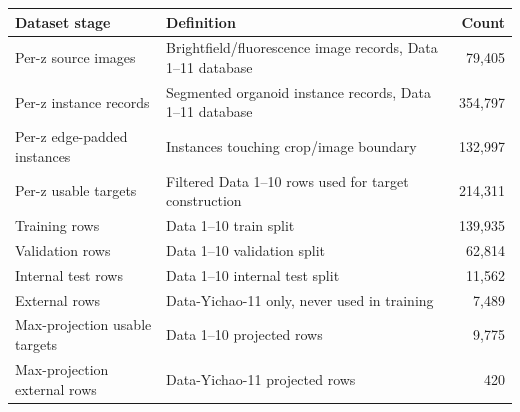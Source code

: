 \begin{tabular}{@{}llr@{}}
\toprule
Dataset stage & Definition & Count \\
\midrule
Per-z source images & Brightfield/fluorescence image records, Data 1--11 database & 79,405 \\
Per-z instance records & Segmented organoid instance records, Data 1--11 database & 354,797 \\
Per-z edge-padded instances & Instances touching crop/image boundary & 132,997 \\
Per-z usable targets & Filtered Data 1--10 rows used for target construction & 214,311 \\
Training rows & Data 1--10 train split & 139,935 \\
Validation rows & Data 1--10 validation split & 62,814 \\
Internal test rows & Data 1--10 internal test split & 11,562 \\
External rows & Data-Yichao-11 only, never used in training & 7,489 \\
\midrule
Max-projection usable targets & Data 1--10 projected rows & 9,775 \\
Max-projection external rows & Data-Yichao-11 projected rows & 420 \\
\bottomrule
\end{tabular}
